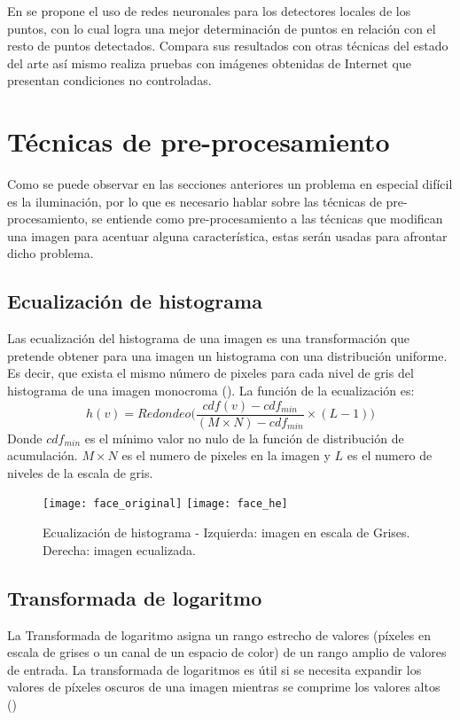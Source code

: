 En \cite{baltrusaitis2013constrained} se propone el uso de redes neuronales para los detectores locales de los puntos, con lo cual logra una mejor determinación de puntos en relación con el resto de puntos detectados. Compara sus resultados con otras técnicas del estado del arte así mismo realiza pruebas con imágenes obtenidas de Internet que presentan condiciones no controladas.

\section{Técnicas de pre-procesamiento}
Como se puede observar en las secciones anteriores un problema en especial difícil es la iluminación, por lo que es necesario hablar sobre las técnicas de pre-procesamiento, se entiende como pre-procesamiento a las técnicas que modifican una imagen para acentuar alguna característica, estas serán usadas para afrontar dicho problema.

\subsection{Ecualización de histograma}
Las ecualización del histograma de una imagen es una transformación que pretende obtener para una imagen un histograma con una distribución uniforme. Es decir, que exista el mismo número de pixeles para cada nivel de gris del histograma de una imagen monocroma (\cite{orlova2002image}).
La función de la ecualización es:
\begin{equation}
h(v)=Redondeo\Bigg(\frac{cdf(v)-cdf_{min}}{(M\times N)-cdf_{min}} \times (L-1)\Bigg)
\end{equation}
Donde $cdf_{min}$ es el mínimo valor no nulo de la función de distribución de acumulación. $M\times N$ es el numero de pixeles en la imagen y $L$ es el numero de niveles de la escala de gris.

\begin{figure}[h]
\center
\texttt{[image: face\_original]}
\hspace{1cm}
\texttt{[image: face\_he]}
\caption{Ecualización de histograma - Izquierda: imagen en escala de Grises. Derecha: imagen ecualizada.}
\label{im:he}
\end{figure}


\subsection{Transformada de logaritmo}
La Transformada de logaritmo asigna un rango estrecho de valores (píxeles en escala de grises o un canal de un espacio de color) de un rango amplio de valores de entrada. La transformada de logaritmos es útil si se necesita expandir los valores de píxeles oscuros de una imagen mientras se comprime los valores altos (\cite{thamiz2015liter})

